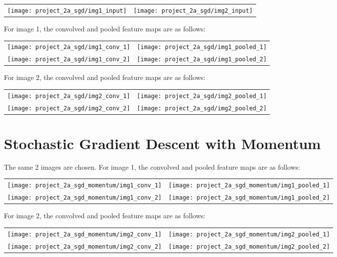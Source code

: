 \begin{longtabu}{X[c]X[c]}
    \texttt{[image: project\_2a\_sgd/img1\_input]} &
    \texttt{[image: project\_2a\_sgd/img2\_input]}
\end{longtabu}

For image 1, the convolved and pooled feature maps are as follows:

\begin{longtabu}{X[c]X[c]}
    \texttt{[image: project\_2a\_sgd/img1\_conv\_1]} &
    \texttt{[image: project\_2a\_sgd/img1\_pooled\_1]} \\
    \texttt{[image: project\_2a\_sgd/img1\_conv\_2]} &
    \texttt{[image: project\_2a\_sgd/img1\_pooled\_2]}
\end{longtabu}

For image 2, the convolved and pooled feature maps are as follows:

\begin{longtabu}{X[c]X[c]}
    \texttt{[image: project\_2a\_sgd/img2\_conv\_1]} &
    \texttt{[image: project\_2a\_sgd/img2\_pooled\_1]} \\
    \texttt{[image: project\_2a\_sgd/img2\_conv\_2]} &
    \texttt{[image: project\_2a\_sgd/img2\_pooled\_2]}
\end{longtabu}

\section*{Stochastic Gradient Descent with Momentum}

The same 2 images are chosen.
For image 1, the convolved and pooled feature maps are as follows:

\begin{longtabu}{X[c]X[c]}
    \texttt{[image: project\_2a\_sgd\_momentum/img1\_conv\_1]} &
    \texttt{[image: project\_2a\_sgd\_momentum/img1\_pooled\_1]} \\
    \texttt{[image: project\_2a\_sgd\_momentum/img1\_conv\_2]} &
    \texttt{[image: project\_2a\_sgd\_momentum/img1\_pooled\_2]}
\end{longtabu}

For image 2, the convolved and pooled feature maps are as follows:

\begin{longtabu}{X[c]X[c]}
    \texttt{[image: project\_2a\_sgd\_momentum/img2\_conv\_1]} &
    \texttt{[image: project\_2a\_sgd\_momentum/img2\_pooled\_1]} \\
    \texttt{[image: project\_2a\_sgd\_momentum/img2\_conv\_2]} &
    \texttt{[image: project\_2a\_sgd\_momentum/img2\_pooled\_2]}
\end{longtabu}

